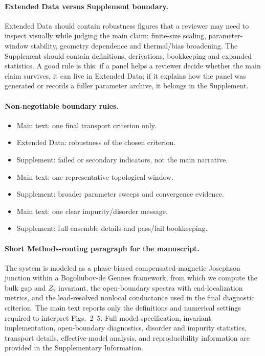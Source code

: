 \paragraph{Extended Data versus Supplement boundary.}
Extended Data should contain robustness figures that a reviewer may need to inspect visually while judging the main claim: finite-size scaling, parameter-window stability, geometry dependence and thermal/bias broadening. The Supplement should contain definitions, derivations, bookkeeping and expanded statistics. A good rule is this: if a panel helps a reviewer decide whether the main claim survives, it can live in Extended Data; if it explains how the panel was generated or records a fuller parameter archive, it belongs in the Supplement.

\paragraph{Non-negotiable boundary rules.}
\begin{itemize}
\item Main text: one final transport criterion only.
\item Extended Data: robustness of the chosen criterion.
\item Supplement: failed or secondary indicators, not the main narrative.
\item Main text: one representative topological window.
\item Supplement: broader parameter sweeps and convergence evidence.
\item Main text: one clear impurity/disorder message.
\item Supplement: full ensemble details and pass/fail bookkeeping.
\end{itemize}

\paragraph{Short Methods-routing paragraph for the manuscript.}
The system is modeled as a phase-biased compensated-magnetic Josephson junction within a Bogoliubov-de Gennes framework, from which we compute the bulk gap and $Z_2$ invariant, the open-boundary spectra with end-localization metrics, and the lead-resolved nonlocal conductance used in the final diagnostic criterion. The main text reports only the definitions and numerical settings required to interpret Figs.~2--5. Full model specification, invariant implementation, open-boundary diagnostics, disorder and impurity statistics, transport details, effective-model analysis, and reproducibility information are provided in the Supplementary Information.

